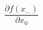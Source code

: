 \newcommand{\partialdiff}[2]{ %
	\frac{\partial #1}{\partial #2} %
}
$$ \partialdiff{ f(x_{...}) }{ x_0 } $$
